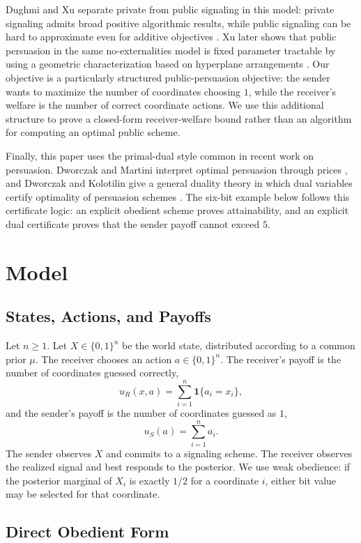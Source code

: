 \documentclass[format=acmsmall, review=false]{acmart}
\begin{document}
Dughmi and Xu separate private from public signaling in this model: private
signaling admits broad positive algorithmic results, while public signaling can
be hard to approximate even for additive objectives
\cite{dughmi2017algorithmic}. Xu later shows that public persuasion in the same
no-externalities model is fixed parameter tractable by using a geometric
characterization based on hyperplane arrangements \cite{xu2020tractability}.
Our objective is a particularly structured public-persuasion objective: the
sender wants to maximize the number of coordinates choosing $1$, while the
receiver's welfare is the number of correct coordinate actions. We use this
additional structure to prove a closed-form receiver-welfare bound rather than
an algorithm for computing an optimal public scheme.

Finally, this paper uses the primal-dual style common in recent work on
persuasion. Dworczak and Martini interpret optimal persuasion through prices
\cite{dworczak2019simple}, and Dworczak and Kolotilin give a general duality
theory in which dual variables certify optimality of persuasion schemes
\cite{dworczak2024duality}. The six-bit example below follows this certificate
logic: an explicit obedient scheme proves attainability, and an explicit dual
certificate proves that the sender payoff cannot exceed $5$.

\section{Model}

\subsection{States, Actions, and Payoffs}

Let $n\geq 1$. Let $X\in\{0,1\}^n$ be the world state, distributed according to
a common prior $\mu$. The receiver chooses an action $a\in\{0,1\}^n$. The
receiver's payoff is the number of coordinates guessed correctly,
\[
u_R(x,a)=\sum_{i=1}^n \mathbf{1}\{a_i=x_i\},
\]
and the sender's payoff is the number of coordinates guessed as $1$,
\[
u_S(a)=\sum_{i=1}^n a_i.
\]
The sender observes $X$ and commits to a signaling scheme. The receiver observes
the realized signal and best responds to the posterior. We use weak obedience:
if the posterior marginal of $X_i$ is exactly $1/2$ for a coordinate $i$, either
bit value may be selected for that coordinate.

\subsection{Direct Obedient Form}
\end{document}
